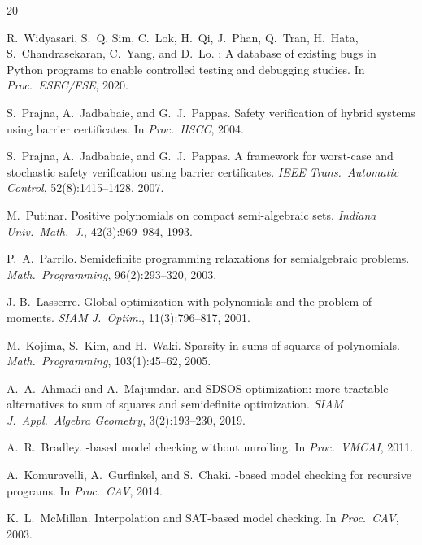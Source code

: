 \documentclass[sigconf,review,anonymous]{acmart}
\begin{document}
\begin{thebibliography}{20}

R.~Widyasari, S.~Q. Sim, C.~Lok, H.~Qi, J.~Phan, Q.~Tran, H.~Hata, S.~Chandrasekaran, C.~Yang, and D.~Lo.
: A database of existing bugs in {P}ython programs to enable controlled testing and debugging studies.
\newblock In \emph{Proc.\ ESEC/FSE}, 2020.

S.~Prajna, A.~Jadbabaie, and G.~J.~Pappas.
\newblock Safety verification of hybrid systems using barrier certificates.
\newblock In \emph{Proc.\ HSCC}, 2004.

S.~Prajna, A.~Jadbabaie, and G.~J.~Pappas.
\newblock A framework for worst-case and stochastic safety verification using barrier certificates.
\newblock \emph{IEEE Trans.\ Automatic Control}, 52(8):1415--1428, 2007.

M.~Putinar.
\newblock Positive polynomials on compact semi-algebraic sets.
\newblock \emph{Indiana Univ.\ Math.\ J.}, 42(3):969--984, 1993.

P.~A.~Parrilo.
\newblock Semidefinite programming relaxations for semialgebraic problems.
\newblock \emph{Math.\ Programming}, 96(2):293--320, 2003.

J.-B.~Lasserre.
\newblock Global optimization with polynomials and the problem of moments.
\newblock \emph{SIAM J.\ Optim.}, 11(3):796--817, 2001.

M.~Kojima, S.~Kim, and H.~Waki.
\newblock Sparsity in sums of squares of polynomials.
\newblock \emph{Math.\ Programming}, 103(1):45--62, 2005.

A.~A.~Ahmadi and A.~Majumdar.
 and {SDSOS} optimization: more tractable alternatives to sum of squares and semidefinite optimization.
\newblock \emph{SIAM J.\ Appl.\ Algebra Geometry}, 3(2):193--230, 2019.

A.~R.~Bradley.
-based model checking without unrolling.
\newblock In \emph{Proc.\ VMCAI}, 2011.

A.~Komuravelli, A.~Gurfinkel, and S.~Chaki.
-based model checking for recursive programs.
\newblock In \emph{Proc.\ CAV}, 2014.

K.~L.~McMillan.
\newblock Interpolation and {SAT}-based model checking.
\newblock In \emph{Proc.\ CAV}, 2003.


\end{thebibliography}
\end{document}
